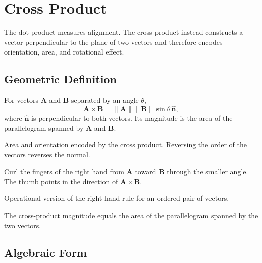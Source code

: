 \section{Cross Product}
\label{sec:cross-product}

The dot product measures alignment. The cross product instead constructs a vector perpendicular to the plane of two vectors and therefore encodes orientation, area, and rotational effect.

\subsection{Geometric Definition}

For vectors $\mathbf A$ and $\mathbf B$ separated by an angle $\theta$,
\[
\boxed{\mathbf A\times\mathbf B=\lVert\mathbf A\rVert\lVert\mathbf B\rVert\sin\theta\,\widehat{\mathbf n}},
\]
where $\widehat{\mathbf n}$ is perpendicular to both vectors. Its magnitude is the area of the parallelogram spanned by $\mathbf A$ and $\mathbf B$.

\begin{bookfigure}{Area and orientation encoded by the cross product. Reversing the order of the vectors reverses the normal.}

\end{bookfigure}

\begin{rulebox}
Curl the fingers of the right hand from $\mathbf A$ toward $\mathbf B$ through the smaller angle. The thumb points in the direction of $\mathbf A\times\mathbf B$.
\end{rulebox}

\begin{bookfigure}{Operational version of the right-hand rule for an ordered pair of vectors.}

\end{bookfigure}

\begin{bookfigure}{The cross-product magnitude equals the area of the parallelogram spanned by the two vectors.}

\label{fig:parallelogram-area}
\end{bookfigure}

\subsection{Algebraic Form}

